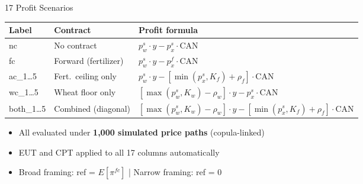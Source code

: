 \documentclass[aspectratio=169,12pt]{beamer}
\begin{document}
\begin{frame}{17 Profit Scenarios}
\small
\begin{table}
\centering
\begin{tabular}{lll}
\toprule
\textbf{Label} & \textbf{Contract} & \textbf{Profit formula} \\
\midrule
nc & No contract & $p_w^s \cdot y - p_x^s \cdot \text{CAN}$ \\
fc & Forward (fertilizer) & $p_w^s \cdot y - p_x^f \cdot \text{CAN}$ \\
\midrule
ac\_1\ldots5 & Fert.\ ceiling only & $p_w^s \cdot y - [\min(p_x^s, K_f) + \rho_f] \cdot \text{CAN}$ \\
wc\_1\ldots5 & Wheat floor only & $[\max(p_w^s, K_w) - \rho_w] \cdot y - p_x^s \cdot \text{CAN}$ \\
both\_1\ldots5 & Combined (diagonal) & $[\max(p_w^s, K_w) - \rho_w] \cdot y - [\min(p_x^s, K_f) + \rho_f] \cdot \text{CAN}$ \\
\bottomrule
\end{tabular}
\end{table}

\vspace{0.3em}
\begin{itemize}
    \item All evaluated under \textbf{1,000 simulated price paths} (copula-linked)
    \item EUT and CPT applied to all 17 columns automatically
    \item Broad framing: ref = $E[\pi^{fc}]$ \quad | \quad Narrow framing: ref = 0
\end{itemize}
\end{frame}
\end{document}
